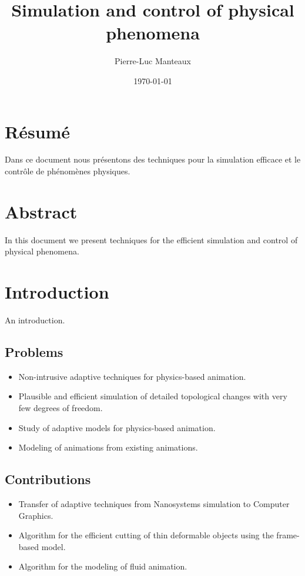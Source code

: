 \documentclass[11pt, oneside, a4paper]{memoir}
\begin{document}
\title{Simulation and control of physical phenomena}
\author{Pierre-Luc Manteaux}
\date{\today}
\maketitle

\frontmatter


\chapter{R\'esum\'e}
Dans ce document nous pr\'esentons des techniques pour la simulation efficace et le contr\^ole de ph\'enom\`enes physiques.

\chapter{Abstract}
In this document we present techniques for the efficient simulation and control of physical phenomena.

\tableofcontents

\mainmatter

\chapter{Introduction}
An introduction.

\section{Problems}
\begin{itemize}
    \item Non-intrusive adaptive techniques for physics-based animation.
    \item Plausible and efficient simulation of detailed topological changes with very few degrees of freedom.
    \item Study of adaptive models for physics-based animation.
    \item Modeling of animations from existing animations.
\end{itemize}

\section{Contributions}
\begin{itemize}
    \item Transfer of adaptive techniques from Nanosystems simulation to Computer Graphics.
    \item Algorithm for the efficient cutting of thin deformable objects using the frame-based model.
    \item Algorithm for the modeling of fluid animation.
\end{itemize}
\end{document}
